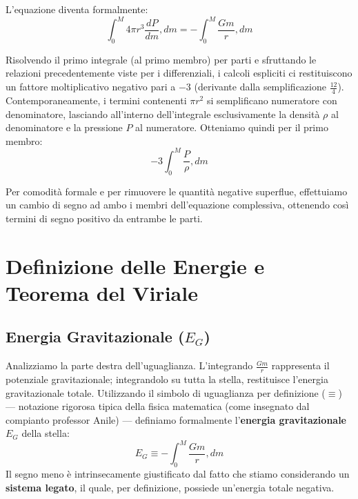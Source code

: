 L'equazione diventa formalmente:
\begin{equation}
\int_{0}^{M} 4\pi r^3 \frac{dP}{dm} , dm = - \int_{0}^{M} \frac{Gm}{r} , dm
\end{equation}

Risolvendo il primo integrale (al primo membro) per parti e sfruttando le relazioni precedentemente viste per i differenziali, i calcoli espliciti ci restituiscono un fattore moltiplicativo negativo pari a $-3$ (derivante dalla semplificazione $\frac{12}{4}$). Contemporaneamente, i termini contenenti $\pi r^2$ si semplificano numeratore con denominatore, lasciando all'interno dell'integrale esclusivamente la densità $\rho$ al denominatore e la pressione $P$ al numeratore.
Otteniamo quindi per il primo membro:
\begin{equation}
-3 \int_{0}^{M} \frac{P}{\rho} , dm
\end{equation}

Per comodità formale e per rimuovere le quantità negative superflue, effettuiamo un cambio di segno ad ambo i membri dell'equazione complessiva, ottenendo così termini di segno positivo da entrambe le parti.

\section{Definizione delle Energie e Teorema del Viriale}

\subsection{Energia Gravitazionale ($E_G$)}
Analizziamo la parte destra dell'uguaglianza. L'integrando $\frac{Gm}{r}$ rappresenta il potenziale gravitazionale; integrandolo su tutta la stella, restituisce l'energia gravitazionale totale. Utilizzando il simbolo di uguaglianza per definizione ($\equiv$) --- notazione rigorosa tipica della fisica matematica (come insegnato dal compianto professor Anile) --- definiamo formalmente l'\textbf{energia gravitazionale} $E_G$ della stella:
\begin{equation}
E_G \equiv - \int_{0}^{M} \frac{Gm}{r} , dm
\end{equation}
Il segno meno è intrinsecamente giustificato dal fatto che stiamo considerando un \textbf{sistema legato}, il quale, per definizione, possiede un'energia totale negativa.

